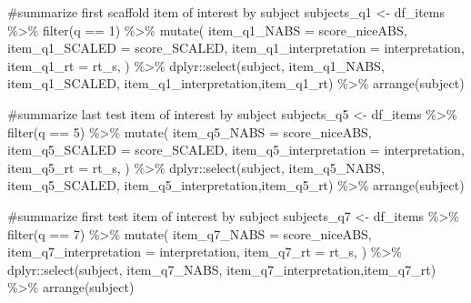 \documentclass[
  letterpaper,
  DIV=11,
  numbers=noendperiod]{scrreprt}
\newenvironment{Shaded}{\begin{snugshade}}{\end{snugshade}}
\newcommand{\AttributeTok}[1]{\textcolor[rgb]{0.40,0.45,0.13}{#1}}
\newcommand{\CommentTok}[1]{\textcolor[rgb]{0.37,0.37,0.37}{#1}}
\newcommand{\DecValTok}[1]{\textcolor[rgb]{0.68,0.00,0.00}{#1}}
\newcommand{\FunctionTok}[1]{\textcolor[rgb]{0.28,0.35,0.67}{#1}}
\newcommand{\NormalTok}[1]{\textcolor[rgb]{0.00,0.23,0.31}{#1}}
\newcommand{\OtherTok}[1]{\textcolor[rgb]{0.00,0.23,0.31}{#1}}
\newcommand{\SpecialCharTok}[1]{\textcolor[rgb]{0.37,0.37,0.37}{#1}}
\begin{document}
\begin{Shaded}
\begin{Highlighting}[]
\CommentTok{\#summarize first scaffold item of interest by subject}
\NormalTok{subjects\_q1 }\OtherTok{\textless{}{-}}\NormalTok{ df\_items }\SpecialCharTok{\%\textgreater{}\%} \FunctionTok{filter}\NormalTok{(q }\SpecialCharTok{==} \DecValTok{1}\NormalTok{) }\SpecialCharTok{\%\textgreater{}\%} \FunctionTok{mutate}\NormalTok{(}
  \AttributeTok{item\_q1\_NABS =}\NormalTok{ score\_niceABS,}
  \AttributeTok{item\_q1\_SCALED =}\NormalTok{ score\_SCALED,}
  \AttributeTok{item\_q1\_interpretation =}\NormalTok{ interpretation,}
  \AttributeTok{item\_q1\_rt =}\NormalTok{ rt\_s,}
\NormalTok{) }\SpecialCharTok{\%\textgreater{}\%}\NormalTok{ dplyr}\SpecialCharTok{::}\FunctionTok{select}\NormalTok{(subject, item\_q1\_NABS, item\_q1\_SCALED, item\_q1\_interpretation,item\_q1\_rt) }\SpecialCharTok{\%\textgreater{}\%} \FunctionTok{arrange}\NormalTok{(subject)}

\CommentTok{\#summarize last test item of interest by subject}
\NormalTok{subjects\_q5 }\OtherTok{\textless{}{-}}\NormalTok{ df\_items }\SpecialCharTok{\%\textgreater{}\%} \FunctionTok{filter}\NormalTok{(q }\SpecialCharTok{==} \DecValTok{5}\NormalTok{) }\SpecialCharTok{\%\textgreater{}\%} \FunctionTok{mutate}\NormalTok{(}
  \AttributeTok{item\_q5\_NABS =}\NormalTok{ score\_niceABS,}
  \AttributeTok{item\_q5\_SCALED =}\NormalTok{ score\_SCALED,}
  \AttributeTok{item\_q5\_interpretation =}\NormalTok{ interpretation,}
  \AttributeTok{item\_q5\_rt =}\NormalTok{ rt\_s,}
\NormalTok{) }\SpecialCharTok{\%\textgreater{}\%}\NormalTok{ dplyr}\SpecialCharTok{::}\FunctionTok{select}\NormalTok{(subject, item\_q5\_NABS, item\_q5\_SCALED, item\_q5\_interpretation,item\_q5\_rt) }\SpecialCharTok{\%\textgreater{}\%} \FunctionTok{arrange}\NormalTok{(subject)}

\CommentTok{\#summarize first test item of interest by subject}
\NormalTok{subjects\_q7 }\OtherTok{\textless{}{-}}\NormalTok{ df\_items }\SpecialCharTok{\%\textgreater{}\%} \FunctionTok{filter}\NormalTok{(q }\SpecialCharTok{==} \DecValTok{7}\NormalTok{) }\SpecialCharTok{\%\textgreater{}\%} \FunctionTok{mutate}\NormalTok{(}
  \AttributeTok{item\_q7\_NABS =}\NormalTok{ score\_niceABS,}
  \AttributeTok{item\_q7\_interpretation =}\NormalTok{ interpretation,}
  \AttributeTok{item\_q7\_rt =}\NormalTok{ rt\_s,}
\NormalTok{) }\SpecialCharTok{\%\textgreater{}\%}\NormalTok{ dplyr}\SpecialCharTok{::}\FunctionTok{select}\NormalTok{(subject, item\_q7\_NABS, item\_q7\_interpretation,item\_q7\_rt) }\SpecialCharTok{\%\textgreater{}\%} \FunctionTok{arrange}\NormalTok{(subject)}


\end{Highlighting}
\end{Shaded}
\end{document}
